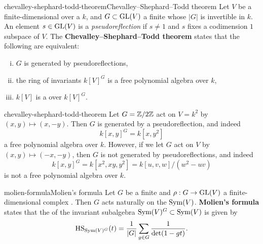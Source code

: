 \begin{topic}{chevalley-shephard-todd-theorem}{Chevalley--Shephard--Todd theorem}
    Let $V$ be a finite-dimensional  over a  $k$, and $G \subset \textup{GL}(V)$ a finite  whose  $|G|$ is invertible in $k$. An element $s \in \textup{GL}(V)$ is a \textit{pseudoreflection} if $s \ne 1$ and $s$ fixes a codimension $1$ subspace of $V$. The \textbf{Chevalley--Shephard--Todd theorem} states that the following are equivalent:
    \begin{enumerate}[(i)]
        \item $G$ is generated by pseudoreflections,
        \item the ring of invariants $k[V]^G$ is a free polynomial algebra over $k$,
        \item $k[V]$ is a  over $k[V]^G$.
    \end{enumerate}
\end{topic}

\begin{example}{chevalley-shephard-todd-theorem}
    Let $G = \mathbb{Z}/2\mathbb{Z}$ act on $V = k^2$ by $(x, y) \mapsto (x, -y)$. Then $G$ is generated by a pseudoreflection, and indeed
    \[ k[x, y]^G = k[x, y^2] \]
    a free polynomial algebra over $k$. However, if we let $G$ act on $V$ by $(x, y) \mapsto (-x, -y)$, then $G$ is not generated by pseudoreflections, and indeed
    \[ k[x, y]^G = k[x^2, xy, y^2] = k[u, v, w] / (w^2 - uv) \]
    is not a free polynomial algebra over $k$.
\end{example}

\begin{topic}{molien-formula}{Molien's formula}
    Let $G$ be a finite  and $\rho : G \to \textup{GL}(V)$ a finite-dimensional complex . Then $G$ acts naturally on the  $\textup{Sym}(V)$. \textbf{Molien's formula} states that the  of the invariant subalgebra $\textup{Sym}(V)^G \subset \textup{Sym}(V)$ is given by
    \[ \textup{HS}_{\textup{Sym}(V)^G}(t) = \frac{1}{|G|} \sum_{g \in G} \frac{1}{\det(1 - gt)} . \]
\end{topic}

